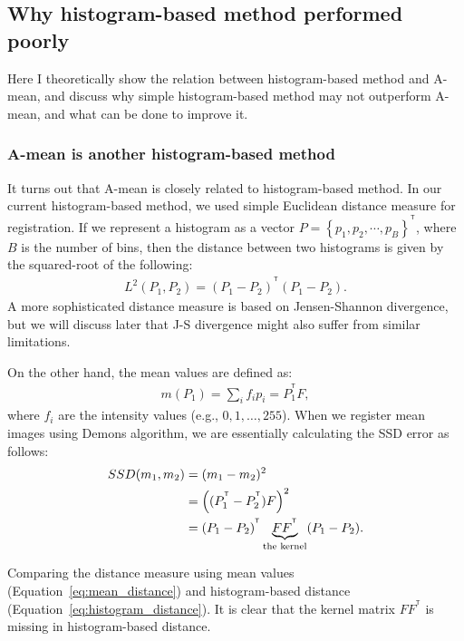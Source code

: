 \documentclass[preprint,review,12pt]{elsarticle}
\newcommand{\eg}{{e.g., }}
\def\Transpose{{^\mathsf{T}}}
\newcommand{\NBin}{B}										%
\begin{document}
\subsection{Why histogram-based method performed poorly}
Here I theoretically show the relation between histogram-based method and A-mean, and discuss why simple histogram-based method may not outperform A-mean, and what can be done to improve it.

\subsubsection{A-mean is another histogram-based method}
It turns out that A-mean is closely related to histogram-based method. In our current histogram-based method, we used simple Euclidean distance measure for registration. If we represent a histogram as a vector $P=\left\{ p_1, p_2, \cdots, p_\NBin \right\}^\Transpose$, where $\NBin$ is the number of bins, then the distance between two histograms is given by the squared-root of the following:
\begin{align}
L^2(P_1,P_2)=(P_1-P_2)^\Transpose(P_1-P_2).
\label{eq:histogram_distance}
\end{align}
A more sophisticated distance measure is based on Jensen-Shannon divergence, but we will discuss later that J-S divergence might also suffer from similar limitations.

On the other hand, the mean values are defined as:
\begin{align}
m(P_1)=\sum_i f_i p_i=P_1^{\Transpose} F,
\end{align}
where $f_i$ are the intensity values (\eg $0,1,\ldots,255$). When we register mean images using Demons algorithm, we are essentially calculating the SSD error as follows:
\begin{align}
SSD(m_1,m_2)&=(m_1-m_2)^2 \notag \\
						&=\left((P_1^\Transpose-P_2^\Transpose) F\right)^2 \notag \\
						&=(P_1-P_2)^\Transpose \underbrace{F F^\Transpose}_{\text{the kernel}} (P_1-P_2).
\label{eq:mean_distance}
\end{align}

Comparing the distance measure using mean values (Equation~\ref{eq:mean_distance}) and histogram-based distance (Equation~\ref{eq:histogram_distance}). It is clear that the kernel matrix $F F^\Transpose$ is missing in histogram-based distance.
\end{document}
